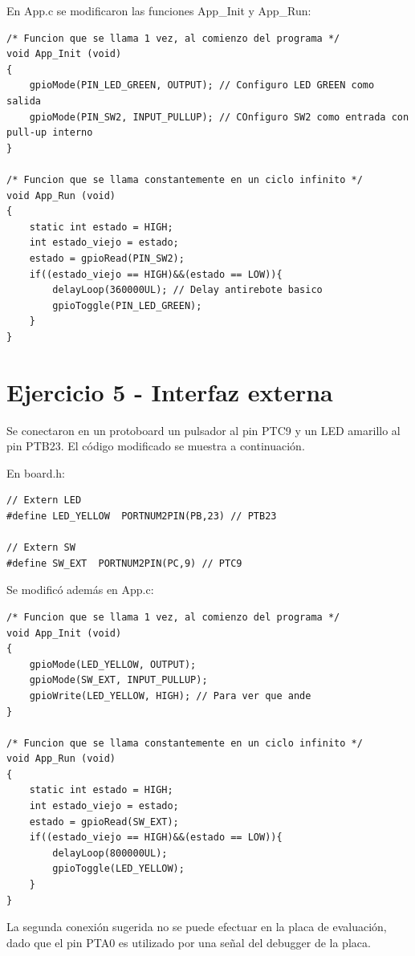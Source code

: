 \documentclass{article}
\begin{document}
En App.c se modificaron las funciones App\_Init y App\_Run:

\begin{lstlisting}
/* Funcion que se llama 1 vez, al comienzo del programa */
void App_Init (void)
{
    gpioMode(PIN_LED_GREEN, OUTPUT); // Configuro LED GREEN como salida
    gpioMode(PIN_SW2, INPUT_PULLUP); // COnfiguro SW2 como entrada con pull-up interno
}

/* Funcion que se llama constantemente en un ciclo infinito */
void App_Run (void)
{
	static int estado = HIGH;
	int estado_viejo = estado;
	estado = gpioRead(PIN_SW2);
	if((estado_viejo == HIGH)&&(estado == LOW)){
		delayLoop(360000UL); // Delay antirebote basico
		gpioToggle(PIN_LED_GREEN);
	}
}
\end{lstlisting}

\newpage

\section*{Ejercicio 5 - Interfaz externa}

Se conectaron en un protoboard un pulsador al pin PTC9 y un LED amarillo al pin PTB23. El código modificado se muestra a continuación.

En board.h:

\begin{lstlisting}
// Extern LED
#define LED_YELLOW	PORTNUM2PIN(PB,23) // PTB23

// Extern SW
#define SW_EXT	PORTNUM2PIN(PC,9) // PTC9
\end{lstlisting}

Se modificó además en App.c:

\begin{lstlisting}
/* Funcion que se llama 1 vez, al comienzo del programa */
void App_Init (void)
{
    gpioMode(LED_YELLOW, OUTPUT);
    gpioMode(SW_EXT, INPUT_PULLUP);
    gpioWrite(LED_YELLOW, HIGH); // Para ver que ande
}

/* Funcion que se llama constantemente en un ciclo infinito */
void App_Run (void)
{
	static int estado = HIGH;
	int estado_viejo = estado;
	estado = gpioRead(SW_EXT);
	if((estado_viejo == HIGH)&&(estado == LOW)){
		delayLoop(800000UL);
		gpioToggle(LED_YELLOW);
	}
}
\end{lstlisting}

La segunda conexión sugerida no se puede efectuar en la placa de evaluación, dado que el pin PTA0 es utilizado por una señal del debugger de la placa.
\end{document}
